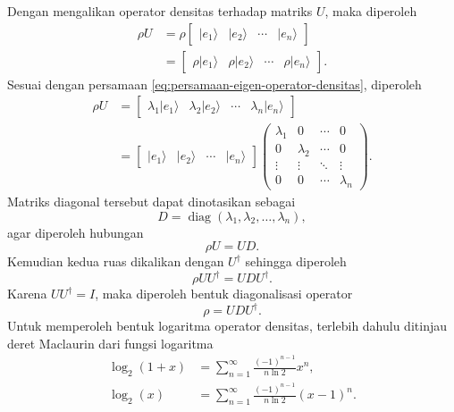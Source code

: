 Dengan mengalikan operator densitas terhadap matriks $U$, maka diperoleh
\begin{equation}
\begin{split}
    \rho U
    &=
    \rho
    \begin{bmatrix}
        |e_1\rangle &
        |e_2\rangle &
        \cdots &
        |e_n\rangle
    \end{bmatrix}
    \\
    &=
    \begin{bmatrix}
        \rho|e_1\rangle &
        \rho|e_2\rangle &
        \cdots &
        \rho|e_n\rangle
    \end{bmatrix}.
\end{split}
\end{equation}
Sesuai dengan persamaan \eqref{eq:persamaan-eigen-operator-densitas}, diperoleh
\begin{equation}
\begin{split}
    \rho U
    &=
    \begin{bmatrix}
        \lambda_1|e_1\rangle &
        \lambda_2|e_2\rangle &
        \cdots &
        \lambda_n|e_n\rangle
    \end{bmatrix}
    \\
    &=
    \begin{bmatrix}
        |e_1\rangle &
        |e_2\rangle &
        \cdots &
        |e_n\rangle
    \end{bmatrix}
    \begin{pmatrix}
        \lambda_1 &0&\cdots&0\\
        0&\lambda_2&\cdots&0\\
        \vdots&\vdots&\ddots&\vdots\\
        0&0&\cdots&\lambda_n
    \end{pmatrix}.
\end{split}
\end{equation}
Matriks diagonal tersebut dapat dinotasikan sebagai
\begin{equation}
    D=
    \operatorname{diag}
    (\lambda_1,\lambda_2,\ldots,\lambda_n),
\end{equation}
agar diperoleh hubungan
\begin{equation}
    \rho U
    =
    UD.
\end{equation}
Kemudian kedua ruas dikalikan dengan $U^\dagger$ sehingga diperoleh
\begin{equation}
    \rho UU^\dagger
    =
    UDU^\dagger.
\end{equation}
Karena $UU^\dagger=I$, maka diperoleh bentuk diagonalisasi operator
\begin{equation}
    \label{eq:diagonalisasi_rho}
    \rho
    =
    UDU^\dagger.
\end{equation}
Untuk memperoleh bentuk logaritma operator densitas, terlebih dahulu ditinjau deret Maclaurin dari fungsi logaritma
\begin{align}
    \log_2(1+x)
    &=
    \sum_{n=1}^{\infty}
    \frac{(-1)^{n-1}}{n\ln2}
    x^n,
    \\
    \log_2(x)
    &=
    \sum_{n=1}^{\infty}
    \frac{(-1)^{n-1}}{n\ln2}
    (x-1)^n.
\end{align}

